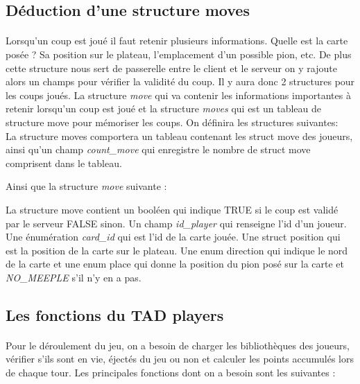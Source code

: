 \documentclass[12pt]{article}
\begin{document}
\subsection{Déduction d'une structure moves}

\paragraph{}
Lorsqu'un coup est joué il faut retenir plusieurs informations. Quelle est la carte posée ? Sa position sur le plateau, l'emplacement d'un possible pion, etc. De plus cette structure nous sert de passerelle entre le client et le serveur on y rajoute alors un champs pour vérifier la validité du coup. Il y aura donc 2 structures pour les coups joués. La structure \textit{move} qui va contenir les informations importantes à retenir lorsqu'un coup est joué et la structure \textit{moves} qui est un tableau de structure move pour mémoriser les coups. On définira les structures suivantes: \\

La structure moves comportera un tableau contenant les struct move des joueurs, ainsi qu'un champ \textit{count\_move} qui enregistre le nombre de struct move comprisent dans le tableau.

Ainsi que la structure \textit{move} suivante :

La structure move contient un booléen qui indique TRUE si le coup est validé par le serveur FALSE sinon. Un champ \textit{id\_player} qui renseigne l'id d'un joueur. Une énumération \textit{card\_id} qui est l'id de la carte jouée. Une struct position qui est la position de la carte sur le plateau. Une enum direction qui indique le nord de la carte et une enum place qui donne la position du pion posé sur la carte et \textit{NO\_MEEPLE} s'il n'y en a pas.

\subsection{Les fonctions du TAD players}

\paragraph{} Pour le déroulement du jeu, on a besoin de charger les bibliothèques des joueurs, vérifier s'ils sont en vie, éjectés du jeu ou non et calculer les points accumulés lors de chaque tour. Les principales fonctions dont on a besoin sont les suivantes : \\
\end{document}
